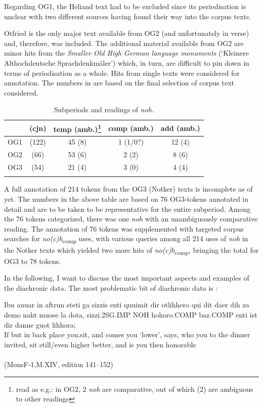 \documentclass[output=paper]{langsci/langscibook}
\begin{document}
Regarding OG1, the Heliand text had to be excluded since its periodisation is unclear with two different sources having found their way into the corpus texts.

Otfried is the only major text available from OG2 (and unfortunately in verse) and, therefore, was included. The additional material available from OG2 are minor hits from the \textit{Smaller Old High German language monuments} (`Kleinere Althochdeutsche Sprachdenkmäler') which, in turn, are difficult to pin down in terms of periodisation as a whole. Hits from single texts were considered for annotation. The numbers in  are based on the final selection of corpus text considered.


\begin{table}[p]
\begin{tabular}{lcccc}
\lsptoprule
	& (cjn) & temp (amb.)\footnote{read as e.g.: in OG2, 2 \textit{noh} are comparative, out of which (2) are ambiguous to other readings}& comp (amb.)	& add (amb.)	\\
\midrule
OG1		& (122) & 45 (8)    & 1 (1/0?)  & 12 (4)    \\
OG2		& (66)  & 53 (6)    & 2 (2)     & 8 (6)     \\
OG3		& (54)  & 21 (4)    & 3 (0)     & 4 (4)     \\
\lspbottomrule
\end{tabular}
\caption{Subperiods and readings of \textit{noh}.}
\label{tab:subperiods_and_readings}
\end{table}

A full annotation of 214 tokens from the OG3 (Notker) texts is incomplete as of yet. The numbers in the above table are based on 76 OG3-tokens annotated in detail and are to be taken to be representative for the entire subperiod. Among the 76 tokens categorized, there was one \textit{noh} with an unambiguously comparative reading. The annotation of 76 tokens was supplemented with targeted corpus searches for \textit{no(c)h}\textsubscript{comp} uses, with various queries among all 214 uses of \textit{noh} in the Notker texts which yielded two more hits of \textit{no(c)h}\textsubscript{comp}, bringing the total for OG3 to 78 tokens.

In the following, I want to discuss the most important aspects and examples of the diachronic data. The most problematic bit of diachronic data is :

\ea\gll Ibu auuar in aftrun steti {ga sizzis} enti quuimit dir otlihhero {qui dit} daer dih za demo {naht muose} {la dota,} sizzi.2SG.IMP NOH hohoro.COMP baz.COMP enti ist dir danne {guot lihhora;}\\
       If but in back place you.sit, and comes you `lower', says, who you to the dinner invited, sit still/even higher better, and is you then honorable\\
 \label{OG1_comp?_00} \\ \hfill (MonsF-1,M.XIV, edition 141--152)
\z
\end{document}
